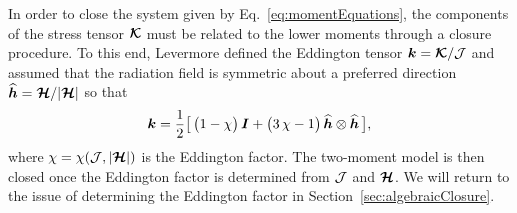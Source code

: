 In order to close the system given by Eq.~\eqref{eq:momentEquations}, the components of the stress tensor $\boldsymbol{\mathcal{K}}$ must be related to the lower moments through a closure procedure.  
To this end, Levermore \cite{levermore_1984} defined the Eddington tensor $\boldsymbol{k}=\boldsymbol{\mathcal{K}}/\mathcal{J}$ and assumed that the radiation field is symmetric about a preferred direction $\widehat{\boldsymbol{h}}=\boldsymbol{\mathcal{H}}/|\boldsymbol{\mathcal{H}}|$ so that
\begin{equation}
  \boldsymbol{k}=\frac{1}{2}\big[\,\big(1-\chi\big)\,\boldsymbol{I}+\big(3\,\chi-1\big)\,\widehat{\boldsymbol{h}}\otimes\widehat{\boldsymbol{h}}\,\big],
  \label{eq:eddingtonTensor}
\end{equation}
where $\chi=\chi(\mathcal{J},|\boldsymbol{\mathcal{H}}|)$ is the Eddington factor.  
The two-moment model is then closed once the Eddington factor is determined from $\mathcal{J}$ and $\boldsymbol{\mathcal{H}}$.  
We will return to the issue of determining the Eddington factor in Section~\ref{sec:algebraicClosure}.  
